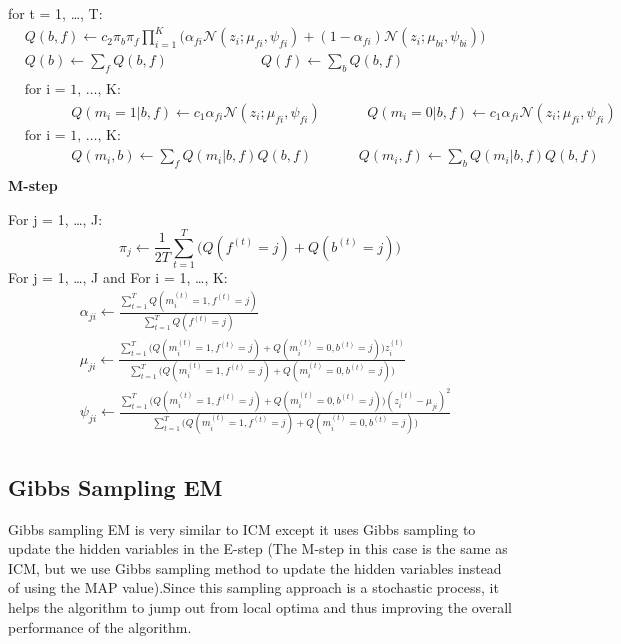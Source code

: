 \documentclass{article} %
\begin{document}
for t = 1, \ldots , T: 
\begin{align*} 
&Q(b,f) \leftarrow c_2\pi_b\pi_f\prod_{i=1}^K\Bigg(\alpha_{fi}\mathcal{N}(z_i;\mu_{fi},\psi_{fi})+ (1-\alpha_{fi})\mathcal{N}(z_i;\mu_{bi},\psi_{bi}) \Bigg) \\
&Q(b) \leftarrow \sum_{f} Q(b,f) \text{ }\text{ }\text{ }\text{ }\text{ }\text{ }\text{ }\text{ }\text{ }\text{ }Q(f) \leftarrow \sum_{b} Q(b,f) \\\\
&\text{for i = 1, \ldots , K: } \\
&\text{ }\text{ }\text{ }\text{ }\text{ }Q(m_i = 1|b,f) \leftarrow c_1\alpha_{fi}\mathcal{N}(z_i;\mu_{fi},\psi_{fi})\text{ }\text{ }\text{ }\text{ }\text{ }Q(m_i = 0|b,f) \leftarrow c_1\alpha_{fi}\mathcal{N}(z_i;\mu_{fi},\psi_{fi})\\
&\text{for i = 1, \ldots , K: } \\
&\text{ }\text{ }\text{ }\text{ }\text{ }Q(m_i,b) \leftarrow \sum_{f}Q(m_i|b,f) Q(b,f)\text{ }\text{ }\text{ }\text{ }\text{ }Q(m_i,f) \leftarrow \sum_{b}Q(m_i|b,f) Q(b,f)\\
\end{align*} 
\textbf{M-step}

For j = 1, \ldots , J: 
\begin{equation*}
\pi_j \leftarrow \frac{1}{2T}\sum_{t=1}^T\Bigg(Q(f^{(t)} = j) + Q(b^{(t)} = j)\Bigg)
\end{equation*}
For j = 1, \ldots , J and For i = 1, \ldots , K: 
\begin{align*} 
&\alpha_{ji} \leftarrow \frac{\sum_{t=1}^T Q(m_i^{(t)}=1,f^{(t)} = j)}{\sum_{t=1}^TQ(f^{(t)} = j)} \\
&\mu_{ji} \leftarrow \frac{\sum_{t=1}^T\Big(Q(m_i^{(t)}=1,f^{(t)} = j) + Q(m_i^{(t)}=0,b^{(t)} = j)\Big)z_i^{(t)}}{\sum_{t=1}^T \Big(Q(m_i^{(t)}=1,f^{(t)} = j) + Q(m_i^{(t)}=0,b^{(t)} = j)\Big)} \\
&\psi_{ji} \leftarrow \frac{\sum_{t=1}^T\Big(Q(m_i^{(t)}=1,f^{(t)} = j) + Q(m_i^{(t)}=0,b^{(t)} = j)\Big)(z_i^{(t)}-\mu_{ji})^2}{\sum_{t=1}^T \Big(Q(m_i^{(t)}=1,f^{(t)} = j) + Q(m_i^{(t)}=0,b^{(t)} = j)\Big)} \\
\end{align*} 
\subsection{Gibbs Sampling EM}
\label{gibbs_em}
Gibbs sampling EM is very similar to ICM except it uses Gibbs sampling to update the hidden variables in the E-step (The M-step in this case is the same as ICM, but we use Gibbs sampling method to update the hidden variables instead of using the MAP value).Since this sampling approach is a stochastic process, it helps the algorithm to jump out from local optima and thus improving the overall performance of the algorithm.
\end{document}
